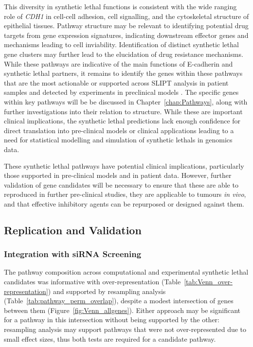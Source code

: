 This diversity in \gls{synthetic lethal} functions is consistent with the wide ranging role of \textit{CDH1} in cell-cell adhesion, cell signalling, and the cytoskeletal structure of epithelial tissues. Pathway structure may be relevant to identifying potential drug targets from \gls{gene expression} signatures, indicating downstream effector genes and mechanisms leading to cell inviability. Identification of distinct \gls{synthetic lethal} gene clusters may further lead to the elucidation of drug resistance mechanisms. While these pathways are indicative of the main functions of \gls{E-cadherin} and \gls{synthetic lethal} partners, it remains to identify the genes within these pathways that are the most actionable or supported across \gls{SLIPT} analysis in patient samples and detected by experiments in preclinical models \citep{Chen2014, Telford2015}.  The specific genes within key pathways will be be discussed in Chapter~\ref{chap:Pathways}, along with further investigations into their relation to  structure.  While these are important clinical implications, the \gls{synthetic lethal} predictions lack enough confidence for direct translation into pre-clinical models or clinical applications leading to a need for statistical modelling and simulation of \glspl{synthetic lethal} in \glspl{genomic}  data.

These \gls{synthetic lethal} pathways have potential clinical implications, particularly those supported in pre-clinical models and in patient  data. However, further validation of gene candidates will be necessary to ensure that these are able to reproduced in further pre-clinical studies, they are applicable to tumours \textit{\gls{in vivo}}, and that effective inhibitory agents can be repurposed or designed against them.

\subsection{Replication and Validation}

\subsubsection{Integration with \gls{siRNA} Screening}

The pathway composition across computational and experimental \gls{synthetic lethal} candidates was informative with over-represent\-ation (Table~\ref{tab:Venn_over-representation}) and supported by resampling analysis (Table~\ref{tab:pathway_perm_overlap}), despite a modest intersection of genes between them (Figure~\ref{fig:Venn_allgenes}). Either approach may be significant for a pathway in this intersection without being supported by the other: resampling analysis may support pathways that were not over-represent\-ed due to small effect sizes, thus both tests are required for a candidate pathway.

